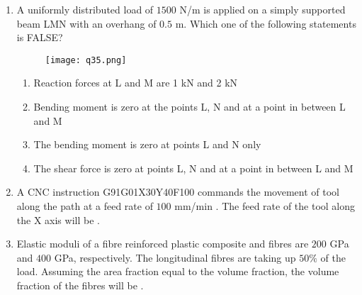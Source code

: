 \documentclass[journal,12pt,onecolumn]{IEEEtran}
\theoremstyle{remark}
\begin{document}
\begin{enumerate}
    \hfill{}
    \begin{enumerate}
    \end{enumerate}

    \item A uniformly distributed load  of $1500$ N/m is applied on a simply supported beam LMN with an overhang of $0.5$ m. Which one of the following statements is FALSE?
    
    \begin{figure}[H]
        \centering
        \texttt{[image: q35.png]}
        \caption*{}
        \label{fig:q35}
    \end{figure}
    
    \hfill{}
    \begin{enumerate}
        \item Reaction forces at L and M are 1 kN and 2 kN
        \item Bending moment is zero at the points L, N and at a point in between L and M
        \item The bending moment is zero at points L and N only
        \item The shear force is zero at points L, N and at a point in between L and M
    \end{enumerate}

    \item A CNC instruction G91G01X30Y40F100 commands the movement of tool along the path at a feed rate of $100$ mm/min . The feed rate of the tool  along the X axis will be \underline{\hspace{2cm}}.
    
    \hfill{}

    \item Elastic moduli of a fibre reinforced plastic composite and fibres are $200$ GPa and $400$ GPa, respectively. The longitudinal fibres are taking up $50\%$ of the load. Assuming the area fraction equal to the volume fraction, the volume fraction of the fibres will be \underline{\hspace{2cm}}.
    

\end{enumerate}
\end{document}
